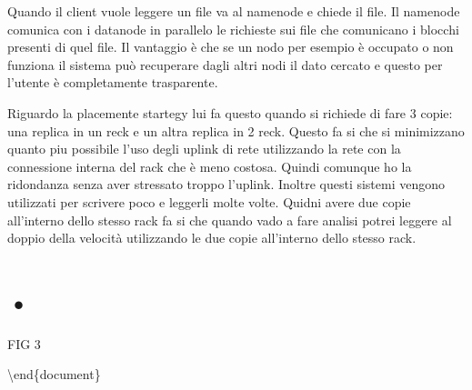 Quando il client vuole leggere un file va al namenode e chiede il file.
Il namenode comunica con i datanode in parallelo le richieste sui file
che comunicano i blocchi presenti di quel file. Il vantaggio è che se un
nodo per esempio è occupato o non funziona il sistema può recuperare
dagli altri nodi il dato cercato e questo per l'utente è completamente
trasparente.

Riguardo la placemente startegy lui fa questo quando si richiede di fare
3 copie: una replica in un reck e un altra replica in 2 reck. Questo fa
si che si minimizzano quanto piu possibile l'uso degli uplink di rete
utilizzando la rete con la connessione interna del rack che è meno
costosa. Quindi comunque ho la ridondanza senza aver stressato troppo
l'uplink. Inoltre questi sistemi vengono utilizzati per scrivere poco e
leggerli molte volte. Quidni avere due copie all'interno dello stesso
rack fa si che quando vado a fare analisi potrei leggere al doppio della
velocità utilizzando le due copie all'interno dello stesso rack.

\section{•}

FIG 3

\textbackslash{}end\{document\}
